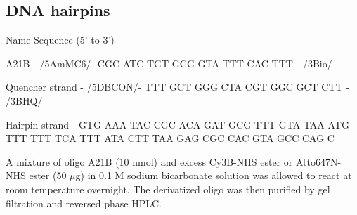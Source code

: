 \subsection{DNA hairpins}
Name Sequence (5’ to 3’)

A21B - \slash 5AmMC6\slash - CGC ATC TGT GCG GTA TTT CAC TTT - \slash 3Bio\slash

Quencher strand - \slash 5DBCON\slash - TTT GCT GGG CTA CGT GGC GCT CTT - \slash 3BHQ\slash

Hairpin strand - GTG AAA TAC CGC ACA GAT GCG TTT GTA TAA ATG TTT TTT TCA TTT ATA CTT TAA GAG CGC CAC GTA GCC CAG C 

A mixture of oligo A21B (10 nmol) and excess Cy3B-NHS ester or Atto647N-NHS ester (50 $\mu$g) in 0.1 M sodium bicarbonate solution was allowed to react at room temperature overnight. The derivatized oligo was then purified by gel filtration and reversed phase HPLC. 

